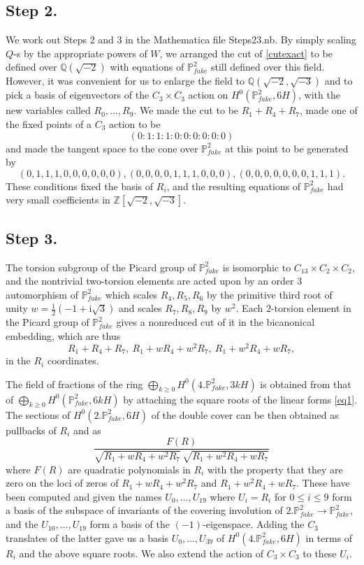 \documentclass[11pt,reqno]{amsart}
\def\ii {{\mathrm i}}
\def\Q {{\mathbb Q}}
\def\Z {{\mathbb Z}}
\def\P {{\mathbb P}}
\def\FPP {{\P^2_{fake}}}
\theoremstyle{definition}
\numberwithin{equation}{section}
\begin{document}
\subsection{Step 2.} 
We work out Steps 2 and 3 in the Mathematica file Steps23.nb. By simply scaling $Q$-s by the appropriate powers of $W$, we arranged the cut of \eqref{cutexact} to be defined over $\Q(\sqrt {-2})$ with equations of $\FPP$ still defined over this field. However, it was convenient for us to enlarge the field to $\Q(\sqrt {-2},\sqrt{-3})$ and to pick a basis of eigenvectors of the $C_3\times C_3$ action on $H^0(\FPP,6H)$, with the new variables called $R_0,\ldots, R_9$. We made the cut to be $R_1+R_4+R_7$, made one of the fixed points of a $C_3$ action to be 
$$
(0: 1: 1: 1: 0: 0: 0: 0: 0: 0)
$$
and made the tangent space to the cone over $\FPP$ at this point to be generated by 
$$
(0, 1, 1, 1, 0, 0, 0, 0, 0, 0), (0, 0, 0, 0, 1, 1, 1, 0, 0, 0), (0, 0, 0, 0, 0, 0, 0, 1, 1, 1).
$$
These  conditions fixed the basis of $R_i$, and the resulting equations of $\FPP$ had very small coefficients in $\Z[\sqrt {-2},\sqrt{-3}]$.


\subsection{Step 3.} 
The torsion subgroup of the Picard group of $\FPP$ is isomorphic to $C_{13}\times C_2\times C_2$, and the nontrivial two-torsion elements are acted upon by an order $3$ automorphism of $\FPP$ which scales $R_4,R_5,R_6$ by the primitive third root of unity $w=\frac 12(-1+\ii \sqrt 3)$ 
and scales $R_7,R_8,R_9$ by $w^2$. Each $2$-torsion element in the Picard group of $\FPP$ gives a nonreduced cut of it in the bicanonical embedding, which are thus
\begin{equation}\label{eq1}
R_1+R_4+R_7,~R_1 + w R_4 + w^2 R_7,~ R_1 + w^2 R_4 + w R_7,
\end{equation}
in the $R_i$ coordinates.


\medskip
The field of fractions of the ring $\bigoplus_{k\geq 0} H^0(4.\FPP,3kH)$ is obtained from that of  $\bigoplus_{k\geq 0} H^0(\FPP,6kH)$ by attaching the square roots of the linear forms \eqref{eq1}. The sections of $H^0(2.\FPP,6H)$ of the double cover can be then obtained as pullbacks of $R_i$ and as 
$$
\frac{F(R)}{\sqrt {R_1 + w R_4 + w^2 R_7}\,\sqrt {R_1 + w^2 R_4 + w R_7}}
$$
where $F(R)$ are quadratic polynomials in $R_i$ with the property that they are zero on the loci of zeros of $R_1 + w R_4 + w^2 R_7$ and 
$R_1 + w^2 R_4 + w R_7$. These have been computed and given the names $U_0,\ldots, U_{19}$ where $U_i=R_i$ for $0\leq i\leq 9$ form a basis of the subspace of invariants of the covering involution of $2.\FPP\to \FPP$, and the $U_{10},\ldots,U_{19}$ form a basis of the $(-1)$-eigenspace. Adding the $C_3$ translates of the latter gave us a basis $U_0,\ldots, U_{39}$ of $H^0(4.\FPP,6H)$ in terms of $R_i$ and the above square roots. We also extend the action of $C_3\times C_3$ to these $U_i$. 
\end{document}
